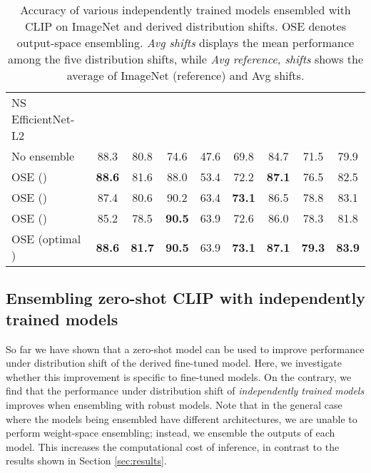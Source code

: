 \begin{table*}
\begin{center}
\begin{tabular}{lc|ccccc|cc}
NS EfficientNet-L2   &            &  & & & &  &  & \\
\quad No ensemble      &           88.3 &           80.8 &           74.6 &           47.6 &           69.8 &           84.7 &           71.5 &           79.9 \\  
\quad OSE ()  &  \textbf{88.6} &           81.6 &           88.0 &           53.4 &           72.2 &  \textbf{87.1} &           76.5 &           82.5 \\                
\quad OSE ()   &           87.4 &           80.6 &           90.2 &           63.4 &  \textbf{73.1} &           86.5 &           78.8 &           83.1 \\                
\quad OSE ()   &           85.2 &           78.5 &  \textbf{90.5} &           63.9 &           72.6 &           86.0 &           78.3 &           81.8 \\                
\quad OSE (optimal ) &  \textbf{88.6} &  \textbf{81.7} &  \textbf{90.5} &           63.9 &  \textbf{73.1} &  \textbf{87.1} &  \textbf{79.3} &  \textbf{83.9} \\ 


\bottomrule
\end{tabular}
\caption{\label{tab:beyond}
Accuracy of various independently trained models ensembled with CLIP on ImageNet and derived distribution shifts. OSE denotes output-space ensembling.  \textit{Avg shifts} displays the mean performance among the five distribution shifts, while \textit{Avg reference, shifts} shows the average of ImageNet (reference) and Avg shifts.
}
\end{center}
\end{table*}


\subsection{Ensembling zero-shot CLIP with independently trained models}
\label{sec:beyond}


So far we have shown that a zero-shot model can be used to improve performance under distribution shift of the derived fine-tuned model. 
Here, we investigate whether this improvement is specific to fine-tuned models. On the contrary, we find that the performance under distribution shift of \textit{independently trained models} improves when ensembling with robust models. Note that in the general case where the models being ensembled have different architectures, we are unable to perform weight-space ensembling;
instead, we ensemble the outputs of each model. This increases the computational cost of inference, in contrast to the results shown in Section \ref{sec:results}.

